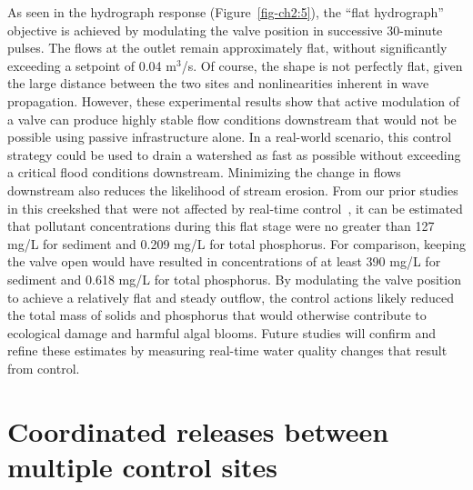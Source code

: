 As seen in the hydrograph response (Figure~\ref{fig-ch2:5}), the ``flat hydrograph'' objective is achieved by modulating the valve position in successive 30-minute pulses. The flows at the outlet remain approximately flat, without significantly exceeding a setpoint of 0.04 m$^3$/s. Of course, the shape is not perfectly flat, given the large distance between the two sites and nonlinearities inherent in wave propagation. However, these experimental results show that active modulation of a valve can produce highly stable flow conditions downstream that would not be possible using passive infrastructure alone. In a real-world scenario, this control strategy could be used to drain a watershed as fast as possible without exceeding a critical flood conditions downstream. Minimizing the change in flows downstream also reduces the likelihood of stream erosion. From our prior studies in this creekshed that were not affected by real-time control~\cite{Wong_2016}, it can be estimated that pollutant concentrations during this flat stage were no greater than 127 mg/L for sediment and 0.209 mg/L for total phosphorus. For comparison, keeping the valve open would have resulted in concentrations of at least 390 mg/L for sediment and 0.618 mg/L for total phosphorus. By modulating the valve position to achieve a relatively flat and steady outflow, the control actions likely reduced the total mass of solids and phosphorus
that would otherwise contribute to ecological damage and harmful algal blooms. Future studies will confirm and refine these estimates by measuring real-time water quality changes that result from control.


\section{Coordinated releases between multiple control sites}

